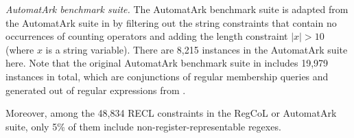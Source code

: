 \medskip
\noindent
\emph{AutomatArk benchmark suite.}
The AutomatArk benchmark suite is adapted from the AutomatArk suite in \cite{z3str3re} by filtering out the string constraints that contain no occurrences of counting operators and adding the length constraint $|x| > 10$ (where $x$ is a string variable). There are 8,215 instances in the AutomatArk suite here.
Note that the original AutomatArk benchmark suite in \cite{z3str3re} includes 19,979 instances in total, which are conjunctions of regular membership queries and generated out of regular expressions from \cite{automatark}. 

Moreover, among the 48,834 RECL constraints in the RegCoL or AutomatArk suite, only 5\% of them include non-register-representable regexes.

